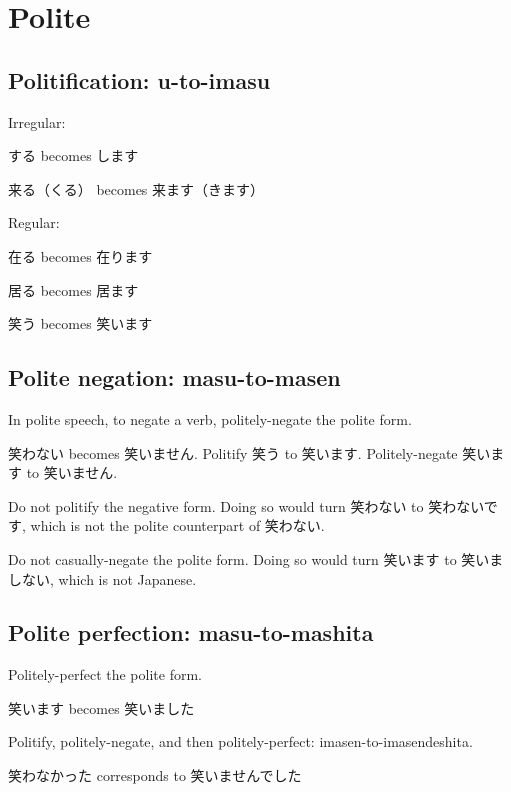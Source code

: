 \chapter{Polite}

\section{Politification: u-to-imasu}

Irregular:

する becomes します

来る（くる） becomes 来ます（きます）

Regular:

在る becomes 在ります

居る becomes 居ます

笑う becomes 笑います

\section{Polite negation: masu-to-masen}

In polite speech, to negate a verb,
politely-negate the polite form.

笑わない becomes 笑いません.
Politify 笑う to 笑います.
Politely-negate 笑います to 笑いません.

Do not politify the negative form.
Doing so would turn 笑わない to 笑わないです,
which is not the polite counterpart of 笑わない.

Do not casually-negate the polite form.
Doing so would turn 笑います to 笑いましない,
which is not Japanese.

\section{Polite perfection: masu-to-mashita}

Politely-perfect the polite form.

笑います becomes 笑いました

Politify, politely-negate, and then politely-perfect: imasen-to-imasendeshita.

笑わなかった corresponds to 笑いませんでした
